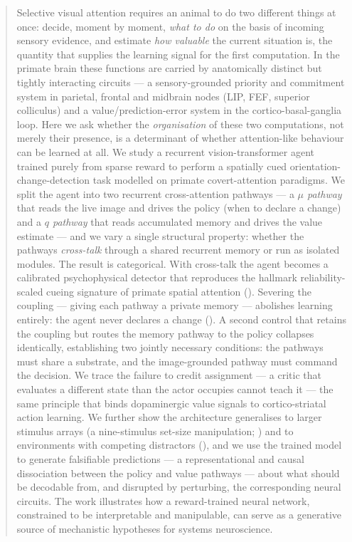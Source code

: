 \begin{abstract}
\noindent
Selective visual attention requires an animal to do two different things at
once: decide, moment by moment, \emph{what to do} on the basis of incoming
sensory evidence, and estimate \emph{how valuable} the current situation is, the
quantity that supplies the learning signal for the first computation. In the
primate brain these functions are carried by anatomically distinct but tightly
interacting circuits --- a sensory-grounded priority and commitment system in
parietal, frontal and midbrain nodes (LIP, FEF, superior colliculus) and a
value/prediction-error system in the cortico-basal-ganglia loop. Here we ask
whether the \emph{organisation} of these two computations, not merely their
presence, is a determinant of whether attention-like behaviour can be learned at
all. We study a recurrent vision-transformer agent trained purely from sparse
reward to perform a spatially cued orientation-change-detection task modelled on
primate covert-attention paradigms. We split the agent into two recurrent
cross-attention pathways --- a \emph{$\mu$ pathway} that reads the live image and
drives the policy (when to declare a change) and a \emph{$q$ pathway} that reads
accumulated memory and drives the value estimate --- and we vary a single
structural property: whether the pathways \emph{cross-talk} through a shared
recurrent memory or run as isolated modules. The result is categorical. With
cross-talk the agent becomes a calibrated psychophysical detector that reproduces
the hallmark reliability-scaled cueing signature of primate spatial attention
(). Severing the coupling --- giving each
pathway a private memory --- abolishes learning entirely: the agent never
declares a change (). A second control that retains the coupling but
routes the memory pathway to the policy collapses identically, establishing two
jointly necessary conditions: the pathways must share a substrate, and the
image-grounded pathway must command the decision. We trace the failure to credit
assignment --- a critic that evaluates a different state than the actor occupies
cannot teach it --- the same principle that binds dopaminergic value signals to
cortico-striatal action learning. We further show the architecture generalises to
larger stimulus arrays (a nine-stimulus set-size manipulation; ) and to environments with competing distractors
(), and we use the trained model to generate falsifiable
predictions --- a representational and causal dissociation between the policy and
value pathways --- about what should be decodable from, and disrupted by
perturbing, the corresponding neural circuits. The work illustrates how a
reward-trained neural network, constrained to be interpretable and manipulable,
can serve as a generative source of mechanistic hypotheses for systems
neuroscience.
\end{abstract}
